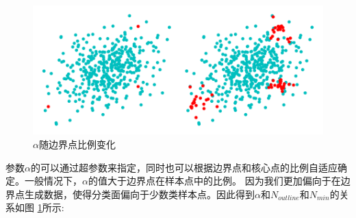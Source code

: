 \documentclass{article}
\begin{document}
\begin{figure}
  \centering
  \includegraphics[width=.8\textwidth]{myplot1.png}
  \caption{$\alpha$随边界点比例变化}
  \label{fig1}
\end{figure}
参数$\alpha$的可以通过超参数来指定，同时也可以根据边界点和核心点的比例自适应确定。一般情况下，$\alpha$的值大于边界点在样本点中的比例。
因为我们更加偏向于在边界点生成数据，使得分类面偏向于少数类样本点。因此得到$\alpha$和$N_{outline}$和$N_{min}$的关系如图 \ref {fig1}所示:
\end{document}
